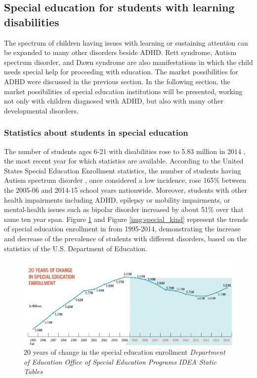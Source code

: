 \documentclass[letterpaper,10pt]{article}
\let\oldsubsection\subsection
\renewcommand{\subsection}{\def\cursectioning{subsection}\oldsubsection}
\begin{document}
\subsection{Special education for students with learning disabilities}

The spectrum of children having issues with learning or sustaining attention can be expanded to many other disorders beside ADHD. Rett syndrome, Autism spectrum disorder, and Dawn syndrome are also manifestations in which the child needs special help for proceeding with education. The market possibilities for ADHD were discussed in the previous section. In the following section, the market possibilities of special education institutions will be presented, working not only with children diagnosed with ADHD, but also with many other developmental disorders. 

\subsubsection{Statistics about students in special education}

The number of students ages 6-21 with disabilities rose to 5.83 million in 2014 , the most recent year for which statistics are available. According to the United States Special Education Enrollment statistics, the number of students having Autism spectrum disorder , once considered a low incidence, rose 165\% between the 2005-06 and 2014-15 school years nationwide.
Moreover, students with other health impairments including ADHD, epilepsy or mobility impairments, or mental-health issues such as bipolar disorder increased by about 51\% over that same ten year span. Figure \ref{img:special_st} and Figure \ref{img:special_kind} represent the trends of special education enrollment in from 1995-2014, demonstrating the increase and decrease of the prevalence of students with different disorders, based on the statistics of the U.S. Department of Education. \cite{samuels_2017}


\begin{figure}[hbt!]
\centering
\includegraphics[scale=0.5]{specialeduenroll.png}
\caption[20 years of change in the special education enrollment]{20 years of change in the special education enrollment \textit{Department of Education Office of Special Education Programs IDEA Static Tables}}
\label{img:special_st}
\end{figure}
 
\end{document}
